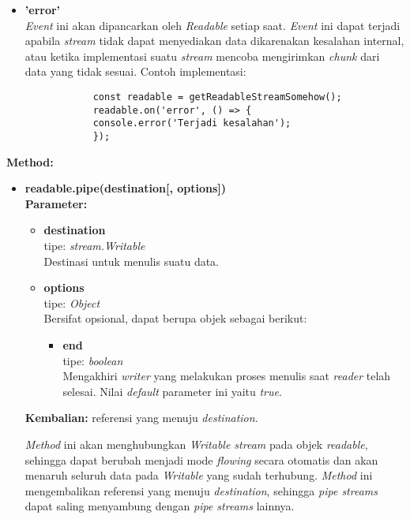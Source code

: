 \begin{enumerate}
\begin{itemize}
\begin{itemize}
			\item \textbf{'error'} \\ \textit{Event} ini akan dipancarkan oleh \textit{Readable} setiap saat. \textit{Event} ini dapat terjadi apabila \textit{stream} tidak dapat menyediakan data dikarenakan kesalahan internal, atau ketika implementasi suatu \textit{stream} mencoba mengirimkan \textit{chunk} dari data yang tidak sesuai. Contoh implementasi:
			\begin{lstlisting}
			const readable = getReadableStreamSomehow();
			readable.on('error', () => {
			console.error('Terjadi kesalahan');
			});
			\end{lstlisting}
			
			
		\end{itemize}
		
		\textbf{Method:}
		\begin{itemize}
			\item \textbf{readable.pipe(destination[, options])} \\ \textbf{Parameter:}
			\begin{itemize}
				\item \textbf{destination} \\tipe: \textit{stream.Writable} \\ Destinasi untuk menulis suatu data.
				\item \textbf{options} \\tipe: \textit{Object} \\ Bersifat opsional, dapat berupa objek sebagai berikut:
				\begin{itemize}
					\item \textbf{end} \\tipe: \textit{boolean} \\ Mengakhiri \textit{writer} yang melakukan proses menulis saat \textit{reader} telah selesai. Nilai \textit{default} parameter ini yaitu \textit{true}.
				\end{itemize}
			\end{itemize}
			\textbf{Kembalian:} referensi yang menuju \textit{destination}.
			
			\textit{Method} ini akan menghubungkan \textit{Writable stream} pada objek \textit{readable}, sehingga dapat berubah menjadi mode \textit{flowing} secara otomatis dan akan menaruh seluruh data pada \textit{Writable} yang sudah terhubung. \textit{Method} ini mengembalikan referensi yang menuju \textit{destination}, sehingga \textit{pipe streams} dapat saling menyambung dengan \textit{pipe streams} lainnya.
			

\end{itemize}
\end{itemize}
\end{enumerate}
